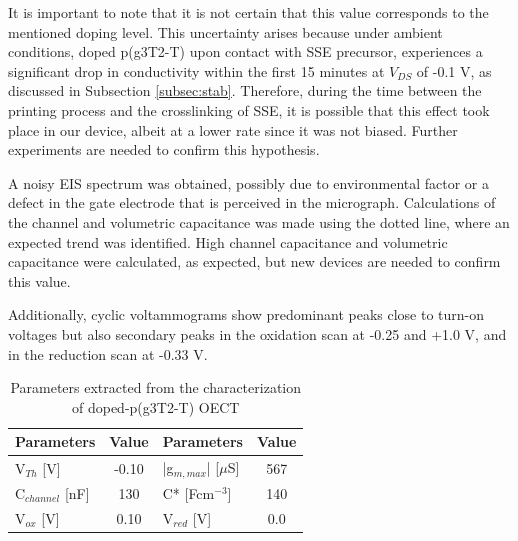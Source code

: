 It is important to note that it is not certain that this value corresponds to the mentioned doping level. This uncertainty arises because under ambient conditions, doped p(g3T2-T) upon contact with SSE precursor, experiences a significant drop in conductivity within the first 15 minutes at $V_{DS}$ of -0.1 V, as discussed in Subsection \ref{subsec:stab}. Therefore, during the time between the printing process and the crosslinking of SSE, it is possible that this effect took place in our device, albeit at a lower rate since it was not biased. Further experiments are needed to confirm this hypothesis.

A noisy EIS spectrum was obtained, possibly due to environmental factor or a defect in the gate electrode that is perceived in the micrograph. Calculations of the channel and volumetric capacitance was made using the dotted line, where an expected trend was identified. High channel capacitance and volumetric capacitance were calculated, as expected, but new devices are needed to confirm this value.  %

Additionally, cyclic voltammograms show predominant peaks close to turn-on voltages but also secondary peaks in the oxidation scan at -0.25 and +1.0 V, and in the reduction scan at -0.33 V. 

\begin{table}[ht]
\centering
\caption{Parameters extracted from the characterization of doped-p(g3T2-T) OECT}
\begin{tabular}{l|c||l|c}
Parameters & Value & Parameters & Value \\\hline \hline
V$_{Th}$ [V] & -0.10 & |g$_{m,max}$| [$\mu$S] & 567 \\
C$_{channel}$ [nF] & 130 & C* [Fcm$^{-3}$] &  140 \\
V$_{ox}$ [V] & 0.10 & V$_{red}$ [V] & 0.0 \\\hline
\end{tabular}
\label{tab:dopedfom}
\end{table}


